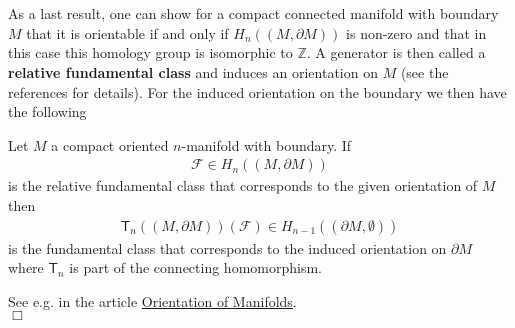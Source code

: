 \\\\
As a last result, one can show for a compact connected manifold with boundary $M$ that it is orientable if and only if $H_{n}((M,\partial M))$ is non-zero and that in this case this homology group is isomorphic to $\mathbb{Z}$. A generator is then called a \textbf{relative fundamental class} and induces an orientation on $M$ (see the references for details). For the induced orientation on the boundary we then have the following
\\
\begin{thm}
Let $M$ a compact oriented $n$-manifold with boundary. If
\begin{align*}
  \mathcal{F}
  \in
  H_{n}((M,\partial M))
\end{align*}
is the relative fundamental class that corresponds to the given orientation of $M$ then
\begin{align*}
  \mathsf{T}_{n}((M,\partial M))(\mathcal{F})
  \in
  H_{n-1}((\partial M,\emptyset))
\end{align*}
is the fundamental class that corresponds to the induced orientation on $\partial M$ where $\mathsf{T}_{n}$ is part of the connecting homomorphism.
\end{thm}
\begin{prf}
See e.g. \cite{wiki-map00000} in the article \href{http://www.map.mpim-bonn.mpg.de/Orientation_of_manifolds}{Orientation of Manifolds}.
\\
\phantom{proven}
\hfill
$\Box$
\end{prf}

